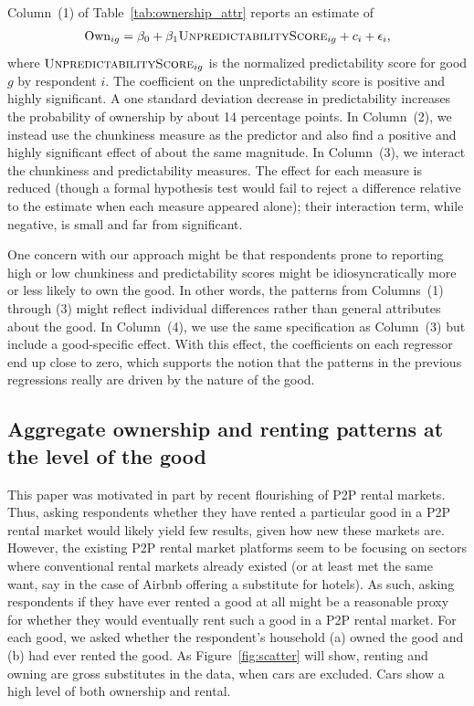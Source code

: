 \documentclass[11pt]{article}
\begin{document}
Column~(1) of Table~\ref{tab:ownership_attr} reports an estimate of 
\begin{align}
  \text{Own}_{ig} = \beta_0 + \beta_1 \textsc{UnpredictabilityScore}_{ig} + c_i + \epsilon_i,
\end{align} 
where $\textsc{UnpredictabilityScore}_{ig}$ is the normalized predictability score for good $g$ by respondent $i$.
The coefficient on the unpredictability score is positive and highly significant.
A one standard deviation decrease in predictability increases the probability of ownership by about 14 percentage points. 
In Column~(2), we instead use the chunkiness measure as the predictor and also find a positive and highly significant effect of about the same magnitude. 
In Column~(3), we interact the chunkiness and predictability measures.
The effect for each measure is reduced (though a formal hypothesis test would fail to reject a difference relative to the estimate when each measure appeared alone); their interaction term, while negative, is small and far from significant.

One concern with our approach might be that respondents prone to reporting high or low chunkiness and predictability scores might be idiosyncratically more or less likely to own the good.
In other words, the patterns from Columns~(1) through (3) might reflect individual differences rather than general attributes about the good.
In Column~(4), we use the same specification as Column~(3) but include a good-specific effect.
With this effect, the coefficients on each regressor end up close to zero, which supports the notion that the patterns in the previous regressions really are driven by the nature of the good. 

\subsection{Aggregate ownership and renting patterns at the level of the good}

This paper was motivated in part by recent flourishing of P2P rental markets. 
Thus, asking respondents whether they have rented a particular good in a P2P rental market would likely yield few results, given how new these markets are.
However, the existing P2P rental market platforms seem to be focusing on sectors where conventional rental markets already existed (or at least met the same want, say in the case of Airbnb offering a substitute for hotels).
As such, asking respondents if they have ever rented a good at all might be a reasonable proxy for whether they would eventually rent such a good in a P2P rental market. 
For each good, we asked whether the respondent's household (a) owned the good and (b) had ever rented the good.
As Figure~\ref{fig:scatter} will show, renting and owning are gross substitutes in the data, when cars are excluded.
Cars show a high level of both ownership and rental. 
\end{document}
